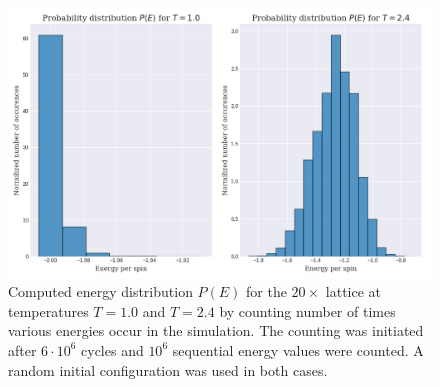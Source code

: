 \documentclass[12pt]{article}
\numberwithin{figure}{section}
\numberwithin{table}{section}
\begin{document}
\begin{figure}[ht]
 \centerline{\includegraphics[scale = 0.60]{20x20_energy_dist}}
 \caption{Computed energy distribution $P(E)$ for the $20\times$ lattice at temperatures $T=1.0$ and $T=2.4$ by counting number of times various energies occur in the simulation. The counting was initiated after $6\cdot10^6$ cycles and $10^6$ sequential energy values were counted. A random initial configuration was used in both cases.}
 \label{fig:20x20_ED}
\end{figure}
\end{document}
